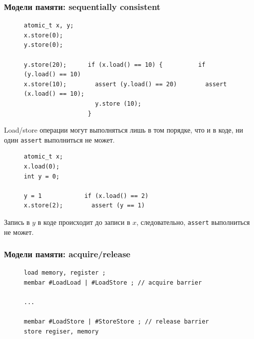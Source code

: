 \documentclass[aspectratio=169, pdf, 8pt, unicode]{beamer}
\begin{document}
\begin{frame}[fragile]
\frametitle{Модели памяти: sequentially consistent}
\begin{figure}[H]
\begin{BVerbatim}
atomic_t x, y;
x.store(0);
y.store(0);

y.store(20);      if (x.load() == 10) {          if (y.load() == 10)
x.store(10);        assert (y.load() == 20)        assert (x.load() == 10);
                    y.store (10);
                  }
\end{BVerbatim}
\end{figure}
Load/store операции могут выполняться лишь в том порядке, что и в коде, ни один \texttt{assert} выполниться не может.
\begin{figure}[H]
\begin{BVerbatim}
atomic_t x;
x.load(0);
int y = 0;

y = 1            if (x.load() == 2)
x.store(2);        assert (y == 1)
\end{BVerbatim}
\end{figure}
Запись в $y$ в коде происходит до записи в $x$, следовательно, \texttt{assert} выполниться не может.
\end{frame}

\begin{frame}[fragile]
\frametitle{Модели памяти: acquire/release}
\begin{figure}[H]
\begin{BVerbatim}
load memory, register ;
membar #LoadLoad | #LoadStore ; // acquire barrier

...

membar #LoadStore | #StoreStore ; // release barrier
store regiser, memory
\end{BVerbatim}
\end{figure}
\end{frame}
\end{document}
